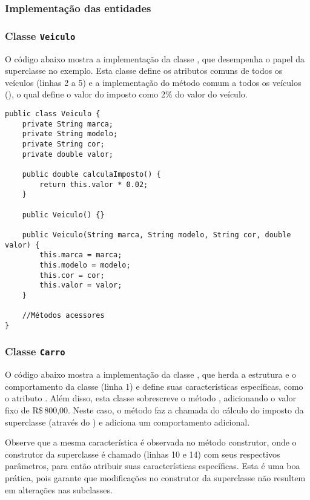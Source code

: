 \subsubsection{Implementação das entidades}

\subsubsection{Classe \texttt{Veiculo}}

O código abaixo mostra a implementação da classe , que desempenha o papel da superclasse no exemplo. Esta classe define os atributos comuns de todos os veículos (linhas 2 a 5) e a implementação do método comum a todos os veículos (), o qual define o valor do imposto como 2\% do valor do veículo.

\begin{verbatim}
public class Veiculo {
	private String marca;
	private String modelo;
	private String cor;
	private double valor;
	
	public double calculaImposto() {
		return this.valor * 0.02;
	}
	
	public Veiculo() {}
	
	public Veiculo(String marca, String modelo, String cor, double valor) {
		this.marca = marca;
		this.modelo = modelo;
		this.cor = cor;
		this.valor = valor;
	}
	
	//Métodos acessores
}
\end{verbatim}

\subsubsection{Classe \texttt{Carro}}

O código abaixo mostra a implementação da classe , que herda a estrutura e o comportamento da classe  (linha 1) e define suas características específicas, como o atributo . Além disso, esta classe sobrescreve o método , adicionando o valor fixo de R\$\,800,00. Neste caso, o método faz a chamada do cálculo do imposto da superclasse (através do ) e adiciona um comportamento adicional.

Observe que a mesma característica é observada no método construtor, onde o construtor da superclasse é chamado (linhas 10 e 14) com seus respectivos parâmetros, para então atribuir suas características específicas. Esta é uma boa prática, pois garante que modificações no construtor da superclasse não resultem em alterações nas subclasses.

